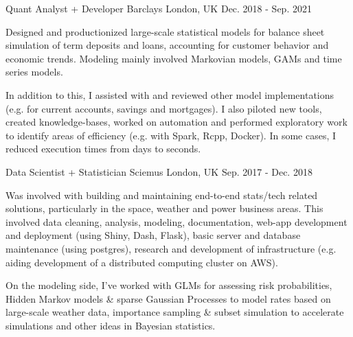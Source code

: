 

\begin{cventries}

  \cventry
    {Quant Analyst + Developer} %
    {Barclays} %
    {London, UK} %
    {Dec. 2018 - Sep. 2021} %
    {
      \begin{cvitems} %
        \item {Designed and productionized large-scale statistical models for balance sheet simulation of term deposits and loans, accounting for customer behavior and economic trends. Modeling mainly involved Markovian models, GAMs and time series models.}
        \item {In addition to this, I assisted with and reviewed other model implementations (e.g. for current accounts, savings and mortgages). I also piloted new tools, created knowledge-bases, worked on automation and performed exploratory work to identify areas of efficiency (e.g. with Spark, Rcpp, Docker). In some cases, I reduced execution times from days to seconds.}
      \end{cvitems}
    }

  \cventry
    {Data Scientist + Statistician} %
    {Sciemus} %
    {London, UK} %
    {Sep. 2017 - Dec. 2018} %
    {
      \begin{cvitems} %
        \item {Was involved with building and maintaining end-to-end stats/tech related solutions, particularly in the space, weather and power business areas. This involved data cleaning, analysis, modeling, documentation, web-app development and deployment (using Shiny, Dash, Flask), basic server and database maintenance (using postgres), research and development of infrastructure (e.g. aiding development of a distributed computing cluster on AWS).}
        \item {On the modeling side, I’ve worked with GLMs for assessing risk probabilities, Hidden Markov models \& sparse Gaussian Processes to model rates based on large-scale weather data, importance sampling \& subset simulation to accelerate simulations and other ideas in Bayesian statistics.}
      \end{cvitems}
    }

\end{cventries}
